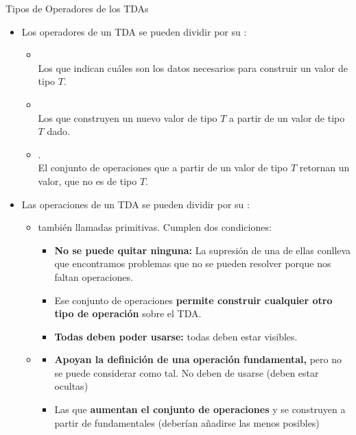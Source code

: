 \documentclass[10pt,envcountsect,spanish]{beamer}
\begin{document}
\begin{frame}{Tipos de Operadores de los TDAs}
\begin{itemize}%
\item Los operadores de un TDA se pueden dividir por su :

	\begin{itemize}
	\item {} \\ Los que indican cuáles son los datos necesarios para construir un valor de tipo $T$.
	\item {} \\ Los que construyen un nuevo valor de tipo $T$ a partir de un valor de tipo $T$ dado.
	\item {}. \\ El conjunto de operaciones que a partir de un valor de tipo $T$ retornan un valor, que no es de tipo $T$.
	\end{itemize}

\item Las operaciones de un TDA se pueden dividir por su :

	\begin{itemize}
	\item {} también llamadas primitivas. Cumplen  dos condiciones:

	\begin{itemize}
		\item \textbf{No se puede quitar ninguna:} La supresión de una de ellas conlleva que encontramos problemas que no se pueden resolver porque nos faltan operaciones.
		\item Ese conjunto de operaciones \textbf{permite construir cualquier otro tipo de operación} sobre el TDA.
		\item \textbf{Todas deben poder usarse:} todas deben estar visibles.
	\end{itemize}

	\item {}

	\begin{itemize}
		\item \textbf{Apoyan la definición de una operación fundamental,} pero no se puede considerar como tal. No deben de usarse (deben estar ocultas)
		\item Las que \textbf{aumentan el conjunto de operaciones} y se construyen a partir de fundamentales (deberían añadirse las menos posibles)
	\end{itemize}

	\end{itemize}

\end{itemize}
\end{frame}
\end{document}
